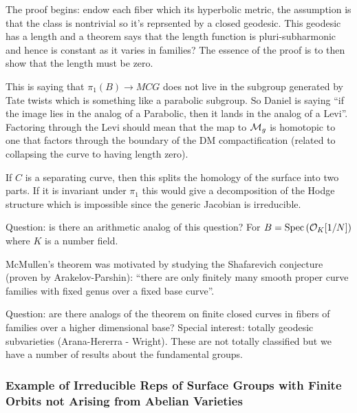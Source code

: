 \documentclass[12pt]{article}
\begin{document}
\begin{rmk}
The proof begins: endow each fiber which its hyperbolic metric, the assumption is that the class is nontrivial so it's reprsented by a closed geodesic. This geodesic has a length and a theorem says that the length function is pluri-subharmonic and hence is constant as it varies in families? The essence of the proof is to then show that the length must be zero. 
\end{rmk}

\begin{rmk}
This is saying that $\pi_1(B) \to MCG$ does not live in the subgroup generated by Tate twists which is something like a parabolic subgroup. So Daniel is saying ``if the image lies in the analog of a Parabolic, then it lands in the analog of a Levi''.  Factoring through the Levi should mean that the map to $\mathcal{M}_g$ is homotopic to one that factors through the boundary of the DM compactification (related to collapsing the curve to having length zero). 
\end{rmk}

\begin{rmk}
If $C$ is a separating curve, then this splits the homology of the surface into two parts. If it is invariant under $\pi_1$ this would give a decomposition of the Hodge structure which is impossible since the generic Jacobian is irreducible. 
\end{rmk}

Question: is there an arithmetic analog of this question? For $B = \mathrm{Spec}\left( \mathcal{O}_{K}[1/N] \right)$ where $K$ is a number field. 

\begin{rmk}
McMullen's theorem was motivated by studying the Shafarevich conjecture (proven by Arakelov-Parshin): ``there are only finitely many smooth proper curve families with fixed genus over a fixed base curve''. 
\end{rmk}

Question: are there analogs of the theorem on finite closed curves in fibers of families over a higher dimensional base? Special interest: totally geodesic subvarieties (Arana-Hererra - Wright). These are not totally classified but we have a number of results about the fundamental groups. 

\subsubsection{Example of Irreducible Reps of Surface Groups with Finite Orbits not Arising from Abelian Varieties}
\end{document}
